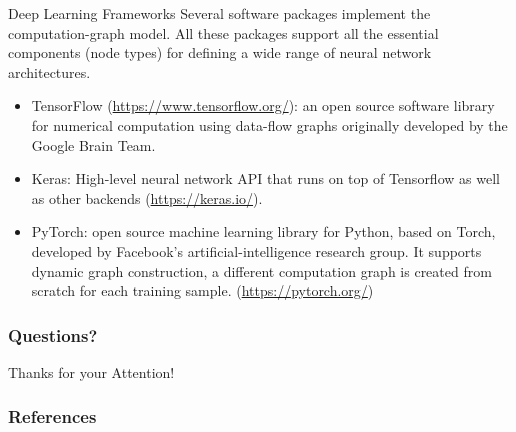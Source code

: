 \documentclass[handout]{beamer}
\begin{document}
\begin{frame}{Deep Learning Frameworks}
Several software packages implement the computation-graph model. All these packages support all the essential components (node types) for defining a wide range of neural network architectures.
\begin{scriptsize}
\begin{itemize}
\item TensorFlow (\url{https://www.tensorflow.org/}): an open source software library for numerical computation using data-flow graphs originally developed by the Google Brain Team. 

\item Keras: High-level neural network API that runs on top of Tensorflow as well as other backends (\url{https://keras.io/}). 

\item PyTorch: open source machine learning library for Python, based on Torch, developed by Facebook's artificial-intelligence research group. It supports dynamic graph construction, a different computation graph is created from scratch for each training sample. (\url{https://pytorch.org/})


\end{itemize}
\end{scriptsize}
\end{frame}




\begin{frame}
\frametitle{Questions?}
\begin{center}\LARGE Thanks for your Attention!\\ \end{center}



\end{frame}

\begin{frame}[allowframebreaks]\scriptsize
\frametitle{References}


%
\end{frame}  


\end{document}
